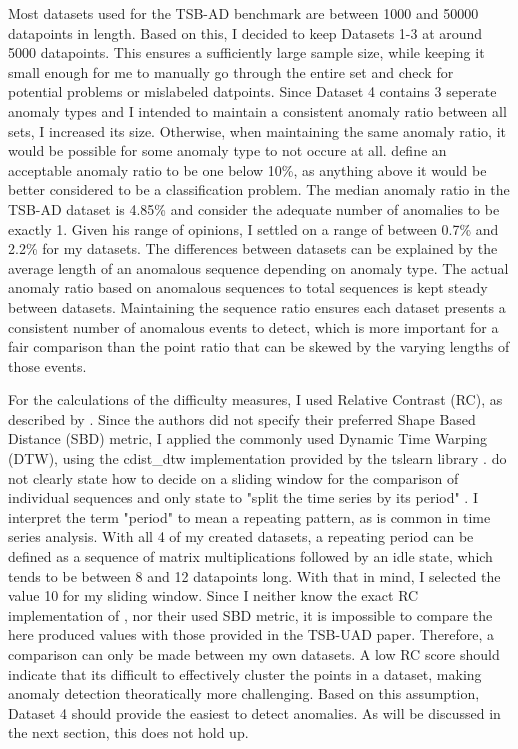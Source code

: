 \documentclass[12pt,oneside]{article}
\begin{document}
Most datasets used for the TSB-AD benchmark are between 1000 and 50000 datapoints in length. Based on this, I decided to keep Datasets 1-3 at around 5000 datapoints. This ensures a sufficiently large sample size, while keeping it small enough for me to manually go through the entire set and check for potential problems or mislabeled datpoints. Since Dataset 4 contains 3 seperate anomaly types and I intended to maintain a consistent anomaly ratio between all sets, I increased its size. Otherwise, when maintaining the same anomaly ratio, it would be possible for some anomaly type to not occure at all. \cite[pp.~8]{SchmidlEtAl2022Anomaly} define an acceptable anomaly ratio to be one below 10\%, as anything above it would be better considered to be a classification problem. The median anomaly ratio in the TSB-AD dataset is 4.85\% and \cite[p.~4]{wu2021current} consider the adequate number of anomalies to be exactly 1. Given his range of opinions, I settled on a range of between 0.7\% and 2.2\% for my datasets. The differences between datasets can be explained by the average length of an anomalous sequence depending on anomaly type. The actual anomaly ratio based on anomalous sequences to total sequences is kept steady between datasets. Maintaining the sequence ratio ensures each dataset presents a consistent number of anomalous events to detect, which is more important for a fair comparison than the point ratio that can be skewed by the varying lengths of those events. \par
For the calculations of the difficulty measures, I used Relative Contrast (RC), as described by \cite[pp.~1704]{paparrizos2022tsb}. Since the authors did not specify their preferred Shape Based Distance (SBD) metric, I applied the commonly used Dynamic Time Warping (DTW), using the cdist\_dtw implementation provided by the tslearn library \parencites{DTW}. \cite[pp.~1704]{paparrizos2022tsb} do not clearly state how to decide on a sliding window for the comparison of individual sequences and only state to "split the time series by its period" \parencite[p.~1704]{paparrizos2022tsb}. I interpret the term "period" to mean a repeating pattern, as is common in time series analysis. With all 4 of my created datasets, a repeating period can be defined as a sequence of matrix multiplications followed by an idle state, which tends to be between 8 and 12 datapoints long. With that in mind, I selected the value 10 for my sliding window. Since I neither know the exact RC implementation of \cite{paparrizos2022tsb}, nor their used SBD metric, it is impossible to compare the here produced values with those provided in the TSB-UAD paper. Therefore, a comparison can only be made between my own datasets. A low RC score should indicate that its difficult to effectively cluster the points in a dataset, making anomaly detection theoratically more challenging. Based on this assumption, Dataset 4 should provide the easiest to detect anomalies. As will be discussed in the next section, this does not hold up.
\end{document}
